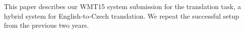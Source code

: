 This paper describes our WMT15 system submission for the translation task, a hybrid system for English-to-Czech translation. We repeat the successful setup from the previous two years.
